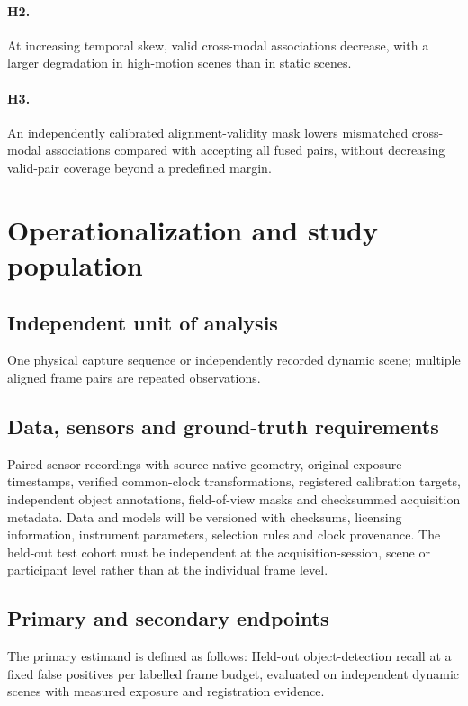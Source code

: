 \documentclass[11pt,a4paper]{article}
\begin{document}
\paragraph{H2.} At increasing temporal skew, valid cross-modal associations decrease, with a larger degradation in high-motion scenes than in static scenes.

\paragraph{H3.} An independently calibrated alignment-validity mask lowers mismatched cross-modal associations compared with accepting all fused pairs, without decreasing valid-pair coverage beyond a predefined margin.

\section{Operationalization and study population}
\subsection{Independent unit of analysis}
One physical capture sequence or independently recorded dynamic scene; multiple aligned frame pairs are repeated observations.

\subsection{Data, sensors and ground-truth requirements}
Paired sensor recordings with source-native geometry, original exposure timestamps, verified common-clock transformations, registered calibration targets, independent object annotations, field-of-view masks and checksummed acquisition metadata. Data and models will be versioned with checksums, licensing information, instrument parameters, selection rules and clock provenance. The held-out test cohort must be independent at the acquisition-session, scene or participant level rather than at the individual frame level.

\subsection{Primary and secondary endpoints}
The primary estimand is defined as follows: Held-out object-detection recall at a fixed false positives per labelled frame budget, evaluated on independent dynamic scenes with measured exposure and registration evidence.
\end{document}
